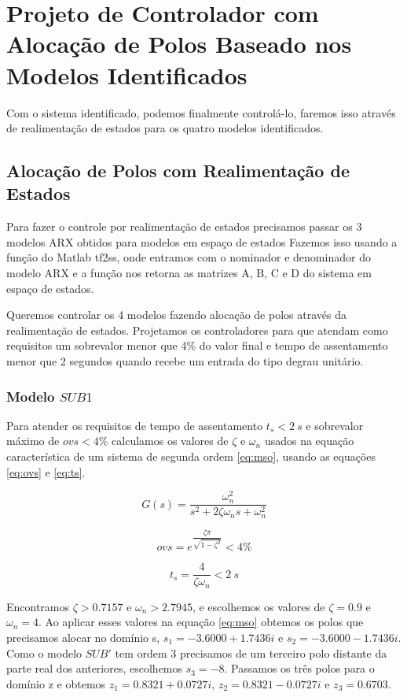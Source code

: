 \chapter{Projeto de Controlador com Alocação de Polos Baseado nos Modelos Identificados} \label{cap5}
Com o sistema identificado, podemos finalmente controlá-lo, faremos isso através de realimentação de estados para os quatro modelos identificados.

\section{Alocação de Polos com Realimentação de Estados}
Para fazer o controle por realimentação de estados precisamos passar os 3 modelos ARX obtidos para modelos em espaço de estados Fazemos isso usando a função do Matlab tf2ss, onde entramos com o nominador e denominador do modelo ARX e a função nos retorna as matrizes A, B, C e D do sistema em espaço de estados. 


Queremos controlar os 4 modelos fazendo alocação de polos através da realimentação de estados. Projetamos os controladores para que atendam como requisitos um sobrevalor menor que 4\% do valor final e tempo de assentamento menor que 2 segundos quando recebe um entrada do tipo degrau unitário.

\subsection{Modelo $SUB1$}

Para atender os requisitos de tempo de assentamento $t_s<2 ~s$ e sobrevalor máximo de $ovs<4\%$ calculamos os valores de $\zeta$ e $\omega_n$ usados na equação característica de um sistema de segunda ordem \eqref{eq:mso}, usando as equações \eqref{eq:ovs} e \eqref{eq:ts}.

\begin{equation}\label{eq:mso}
G(s)=\dfrac{\omega_n^2}{s^2+2 \zeta \omega_n  s+ \omega_n^2}
\end{equation}

\begin{equation}\label{eq:ovs}
ovs=e^{\dfrac{\zeta \pi}{\sqrt{1-\zeta^2}}}<4\%
\end{equation}

\begin{equation}\label{eq:ts}
t_s=\dfrac{4}{\zeta \omega_n}<2~s
\end{equation}

Encontramos $\zeta>0.7157$ e $\omega_n>2.7945$, e escolhemos os valores de $\zeta=0.9$ e $\omega_n=4$. Ao aplicar esses valores na equação \eqref{eq:mso} obtemos os polos que precisamos alocar no domínio s, $s_1=-3.6000 + 1.7436i$ e $s_2=-3.6000 - 1.7436i$. Como o modelo $SUB'$ tem ordem 3 precisamos de um terceiro polo distante da parte real dos anteriores, escolhemos $s_3=-8$. Passamos os três polos para o domínio z e obtemos $z_1=0.8321 + 0.0727i$, $z_2=0.8321 - 0.0727i$ e $z_3=0.6703$. 


